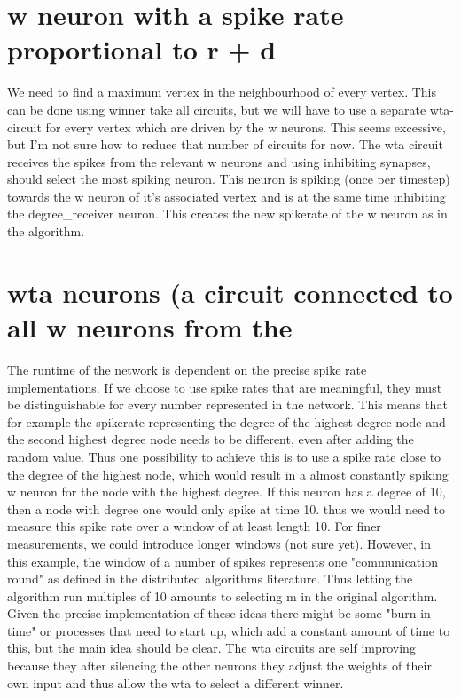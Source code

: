 \section{w neuron with a spike rate proportional to r + d}\label{sec:weight_neuron}
We need to find a maximum vertex in the neighbourhood of every vertex. This
can be done using winner take all circuits, but we will have to use a separate
wta-circuit for every vertex which are driven by the w neurons. This seems
excessive, but I'm not sure how to reduce that number of circuits for now. The
wta circuit receives the spikes from the relevant w neurons and using inhibiting synapses, should select the most spiking neuron. This neuron is spiking (once
per timestep) towards the w neuron of it's associated vertex and is at the same
time inhibiting the degree\_receiver neuron. This creates the new spikerate of
the w neuron as in the algorithm.

\section{wta neurons (a circuit connected to all w neurons from the}\label{sec:wta_circuits}

The runtime of the network is dependent on the precise spike rate
implementations. If we choose to use spike rates that are meaningful, they
must be distinguishable for every number represented in the network. This
means that for example the spikerate representing the degree of the highest
degree node and the second highest degree node needs to be different, even
after adding the random value. Thus one possibility to achieve this is to use a
spike rate close to the degree of the highest node, which would result in a
almost constantly spiking w neuron for the node with the highest degree. If this
neuron has a degree of 10, then a node with degree one would only spike at
time 10. thus we would need to measure this spike rate over a window of at
least length 10. For finer measurements, we could introduce longer windows
(not sure yet). However, in this example, the window of a number of spikes
represents one "communication round" as defined in the distributed algorithms
literature. Thus letting the algorithm run multiples of 10 amounts to selecting m
in the original algorithm. Given the precise implementation of these ideas there
might be some "burn in time" or processes that need to start up, which add a
constant amount of time to this, but the main idea should be clear. The wta
circuits are self improving because they after silencing the other neurons they
adjust the weights of their own input and thus allow the wta to select a different
winner.
